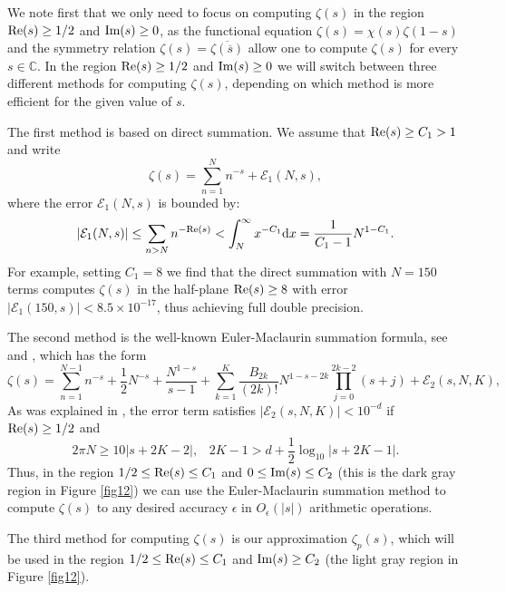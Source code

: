 \documentclass[12pt]{article}
\def\re{\textnormal {Re}}
\def\im{\textnormal {Im}}
\def\c{{\mathbb C}}
\def\d{{\textnormal d}}
\theoremstyle{definition}
\begin{document}
We note first that we only need to focus on computing  $\zeta(s)$ in the region $\re(s)\ge 1/2$ and $\im(s) \ge 0$, as the functional equation $\zeta(s)=\chi(s) \zeta(1-s)$ and the symmetry relation $\zeta(s)=\overline{\zeta(\overline s)}$ allow one to compute $\zeta(s)$ for every $s\in \c$. In the region
$\re(s)\ge 1/2$ and $\im(s) \ge 0$ we will switch between three different methods for computing $\zeta(s)$, depending on which method is more efficient for the given value of $s$.  

The first method is based on direct summation. We assume that $\re(s)\ge C_1>1$ and write 
\begin{equation}\label{direct_sum}
\zeta(s)=\sum\limits_{n=1}^N n^{-s} + {\mathcal E}_1(N,s),
\end{equation}
where the error ${\mathcal E}_1(N,s)$ is bounded by: 
\[
|{\mathcal E}_1(N,s)|\le \sum\limits_{n>N} n^{-\re(s)}<\int_N^{\infty} x^{-C_1} \d x=\frac{1}{C_1-1} N^{1-C_1}. 
\]
For example, setting $C_1=8$ we find that the direct summation with $N=150$ terms computes $\zeta(s)$ in the half-plane $\re(s)\ge 8$ with error  $\vert {\mathcal E}_1(150,s)\vert < 8.5 \times 10^{-17}$, thus achieving full double precision.

The second method is the well-known Euler-Maclaurin summation formula,  see \cite[Section 3]{Borwein_2000} and \cite[Section 2.2.5]{Rubinstein_2005}, which has the form 
\begin{equation}
\label{zeta_EU}
\zeta(s)=\sum\limits_{n=1}^{N-1} n^{-s}
+\frac{1}{2} N^{-s}
+\frac{N^{1-s}}{s-1}+\sum\limits_{k=1}^K  \frac{B_{2k}}{(2k)!} 
N^{1-s-2k} \prod\limits_{j=0}^{2k-2} (s+j)+ {\mathcal E}_2(s,N,K), 
\end{equation}
As was explained in \cite{Rubinstein_2005}, the error term satisfies $|{\mathcal E}_2(s,N,K)|<10^{-d}$ if $\re(s) \ge 1/2$ and
\[
2\pi N \ge 10 |s+2K-2|, \;\;\; 2K-1 > d+\frac{1}{2} \log_{10} |s+2K-1|.
\]
Thus,
in the region  $1/2 \le \re(s) \le C_1$ and $0\le \im(s) \le C_2$ (this is the dark gray region in Figure \ref{fig12}) we can use the Euler-Maclaurin summation method to compute $\zeta(s)$ to any desired accuracy $\epsilon$ in $O_{\epsilon}(|s|)$ arithmetic operations. 

The third method for computing $\zeta(s)$ is our approximation $\zeta_p(s)$, which will be used in the region $1/2 \le \re(s) \le C_1$ and $\im(s) \ge C_2$ (the light gray region in Figure \ref{fig12}). 
\end{document}
